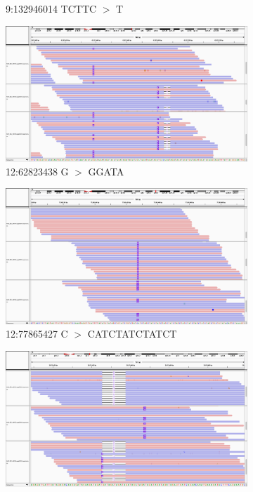 \documentclass{article}
\begin{document}
\begin{landscape}
\begin{figure}[ht!]
\begin{subfigure}[b]{0.33\textwidth}
        \caption{\tiny 9:132946014 TCTTC $>$ T}
    \end{subfigure}
    \begin{subfigure}[b]{0.33\textwidth}
        \includegraphics[width=\textwidth]{figures/12_62823438_GGATAins}
        \caption{\tiny 12:62823438 G $>$ GGATA}
    \end{subfigure}
    \begin{subfigure}[b]{0.33\textwidth}
        \includegraphics[width=\textwidth]{figures/12_77865427_CATCTATCTATCTins}
        \caption{\tiny 12:77865427 C $>$ CATCTATCTATCT}
    \end{subfigure}
    \begin{subfigure}[b]{0.33\textwidth}
        \includegraphics[width=\textwidth]{figures/15_28074425_TGATAins}

\end{subfigure}
\end{figure}
\end{landscape}
\end{document}
